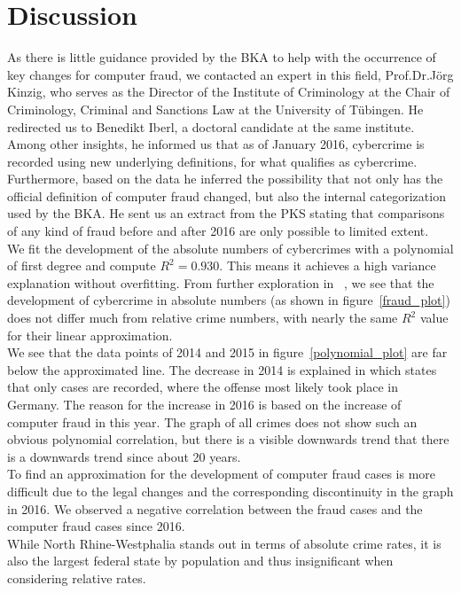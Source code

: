 \documentclass{article}
\theoremstyle{plain}
\theoremstyle{definition}
\theoremstyle{remark}
\begin{document}
\section{Discussion}\label{sec:discussion}
As there is little guidance provided by the BKA to help with the occurrence of key changes for computer fraud, we contacted an expert in this field, Prof.\@ Dr.\@ Jörg Kinzig, who serves as the Director of the Institute of Criminology at the Chair of Criminology, Criminal and Sanctions Law at the University of Tübingen. He redirected us to Benedikt Iberl, a doctoral candidate at the same institute. Among other insights, he informed us that as of January 2016, cybercrime is recorded using new underlying definitions, for what qualifies as cybercrime. Furthermore, based on the data he inferred the possibility that not only has the official definition of computer fraud changed, but also the internal categorization used by the BKA. He sent us an extract from the PKS stating that comparisons of any kind of fraud before and after 2016 are only possible to limited extent.\\
We fit the development of the absolute numbers of cybercrimes with a polynomial of first degree and compute $R^2 = 0.930$. This means it achieves a high variance explanation without overfitting. From further exploration in ~\citet{GitHubTemporal}, we see that the development of cybercrime in absolute numbers (as shown in figure~\ref{fraud_plot}) does not differ much from relative crime numbers, with nearly the same $R^2$ value for their linear approximation. \\
We see that the data points of 2014 and 2015 in figure~\ref{polynomial_plot} are far below the approximated line. The decrease in 2014 is explained in \citet{köppen2015cybercrime} which states that only cases are recorded, where the offense most likely took place in Germany. The reason for the increase in 2016 is based on the increase of computer fraud in this year. 
The graph of all crimes does not show such an obvious polynomial correlation, but there is a visible downwards trend that there is a downwards trend since about 20 years.\\
To find an approximation for the development of computer fraud cases is more difficult due to the legal changes and the corresponding discontinuity in the graph in 2016. We observed a negative correlation between the fraud cases and the computer fraud cases since 2016. \\
While North Rhine-Westphalia stands out in terms of absolute crime rates, it is also the largest federal state by population and thus insignificant when considering relative rates.
\end{document}
